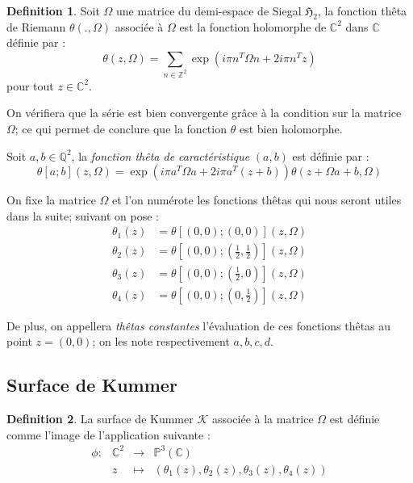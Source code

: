 \documentclass[a4paper,12pt]{article}
\theoremstyle{definition}
\newtheorem{definition}{Definition}[section]
\theoremstyle{remark}
\numberwithin{equation}{section}
\begin{document}
\begin{definition}
Soit $\Omega$ une matrice du demi-espace de Siegal $\mathfrak{H}_2$, la fonction thêta de Riemann $\theta(.,\Omega)$ associée à $\Omega$ est la fonction holomorphe de $\mathbb{C}^2$ dans $\mathbb{C}$ définie par :
$$\theta(z,\Omega) = \sum_{n \in \mathbb{Z}^2}{\exp(i\pi n^T \Omega n + 2i\pi n^T z)}$$
pour tout $z \in \mathbb{C}^2$.

On vérifiera que la série est bien convergente grâce à la condition sur la matrice $\Omega$; ce qui permet de conclure que la fonction $\theta$ est bien holomorphe.

Soit $a,b \in \mathbb{Q}^2$, la \emph{fonction thêta de caractéristique} $(a,b)$ est définie par :
$$\theta[a;b](z,\Omega) = \exp(i\pi a^T\Omega a + 2i\pi a^T(z+b))\theta(z + \Omega a + b, \Omega)$$
\end{definition}

On fixe la matrice $\Omega$ et l'on numérote les fonctions thêtas qui nous seront utiles dans la suite; suivant \citet{gaudry} on pose :
\begin{align*}
\theta_1(z) &= \theta[(0,0);(0,0)](z,\Omega) \\
\theta_2(z) &= \theta[(0,0);(\frac{1}{2},\frac{1}{2})](z,\Omega) \\
\theta_3(z) &= \theta[(0,0);(\frac{1}{2},0)](z,\Omega) \\
\theta_4(z) &= \theta[(0,0);(0,\frac{1}{2})](z,\Omega)
\end{align*}

De plus, on appellera \emph{thêtas constantes} l'évaluation de ces fonctions thêtas au point $z=(0,0)$; on les note respectivement $a,b,c,d$.

\subsection{Surface de Kummer}

\begin{definition}
La surface de Kummer $\mathcal{K}$ associée à la matrice $\Omega$ est définie comme l'image de l'application suivante :
\begin{equation*}
\begin{array}{lrcl}
\phi :&\mathbb{C}^2 & \longrightarrow & \mathbb{P}^3(\mathbb{C}) \\
& z & \longmapsto & (\theta_1(z),\theta_2(z),\theta_3(z),\theta_4(z))
\end{array}
\end{equation*}
\end{definition}
\end{document}
